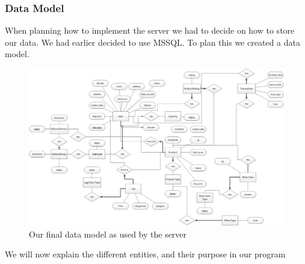\subsubsection{Data Model}
When planning how to implement the server we had to decide on how to store our data. We had earlier decided to use MSSQL. To plan this we created a data model.
\begin{figure}[t]
  \includegraphics[width=\textwidth]{illustrations/Datamodel.png}
  \caption{Our final data model as used by the server}
  \label{fig:datamodel}
\end{figure}
We will now explain the different entities, and their purpose in our program

